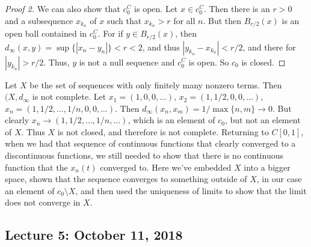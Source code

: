 \documentclass[crop=false,class=article,oneside]{standalone}
\begin{document}
            \begin{proof}[Proof 2]
                We can also show that
                $c_{0}^{C}$ is open.
                Let $x\in{c_{0}^{C}}$. Then there is
                an $r>0$ and a subsequence
                $x_{k_{n}}$ of $x$ such that
                $x_{k_{n}}>r$ for all $n$.
                But then $B_{r/2}(x)$ is
                an open ball contained in $c_{0}^{C}$.
                For if $y\in{B_{r/2}(x)}$, then
                $d_{\infty}(x,y)%
                 =\sup\{|x_{n}-y_{n}|\}<r<2$,
                and thus
                $|y_{k_{n}}-x_{k_{n}}|<r/2$,
                and there for $|y_{k_{n}}|>r/2$.
                Thus, $y$ is not a null sequence and
                $c_{0}^{C}$ is open. So
                $c_{0}$ is closed.
            \end{proof}
            Let $X$ be the set of sequences with only
            finitely many nonzero terms.
            Then $(X,d_{\infty}$ is not complete.
            Let $x_{1}=(1,0,0,\hdots)$,
            $x_{2}=(1,1/2,0,0,\hdots)$,
            $x_{n}=(1,1/2,\hdots,1/n,0,0,\hdots)$.
            Then
            $d_{\infty}(x_{n},x_{m})=1/\max\{n,m\}\rightarrow{0}$.
            But clearly
            $x_{n}\rightarrow(1,1/2,\hdots,1/n,\hdots)$, which
            is an element of $c_{0}$, but not an element
            of $X$. Thus $X$ is not closed, and therefore is
            not complete. Returning to $C[0,1]$, when we had
            that sequence of continuous functions that clearly
            converged to a discontinuous functions, we still
            needed to show that there is no continuous function
            that the $x_{n}(t)$ converged to. Here we've embedded
            $X$ into a bigger space, shown that the
            sequence converges to something outside of $X$,
            in our case an element of
            $c_{0}\setminus{X}$, and then used the uniqueness
            of limits to show that the limit does
            not converge in $X$.
    \subsection{Lecture 5: October 11, 2018}
\end{document}
